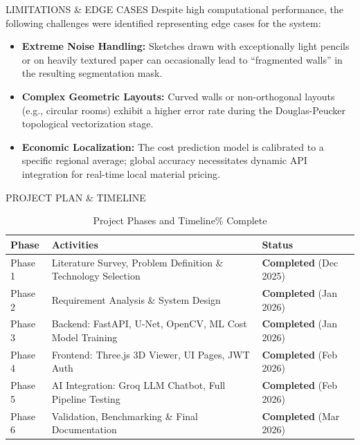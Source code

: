 \documentclass[aspectratio=169]{beamer}
\begin{document}
\begin{frame}{LIMITATIONS \& EDGE CASES}
Despite high computational performance, the following challenges were identified representing edge cases for the system:
\begin{itemize}
  \item \textbf{Extreme Noise Handling:} Sketches drawn with exceptionally light pencils or on heavily textured paper can occasionally lead to ``fragmented walls'' in the resulting segmentation mask.
  \item \textbf{Complex Geometric Layouts:} Curved walls or non-orthogonal layouts (e.g., circular rooms) exhibit a higher error rate during the Douglas-Peucker topological vectorization stage.
  \item \textbf{Economic Localization:} The cost prediction model is calibrated to a specific regional average; global accuracy necessitates dynamic API integration for real-time local material pricing.
\end{itemize}
\end{frame}
\begin{frame}{PROJECT PLAN \& TIMELINE}
\scriptsize
\begin{table}
\centering
\begin{tabular}{p{2cm} p{6.5cm} p{3.5cm}}
\toprule
\textbf{Phase} & \textbf{Activities} & \textbf{Status} \\
\midrule
Phase 1 & Literature Survey, Problem Definition \& Technology Selection & \textbf{Completed} (Dec 2025) \\
Phase 2 & Requirement Analysis \& System Design & \textbf{Completed} (Jan 2026) \\
Phase 3 & Backend: FastAPI, U-Net, OpenCV, ML Cost Model Training & \textbf{Completed} (Jan 2026) \\
Phase 4 & Frontend: Three.js 3D Viewer, UI Pages, JWT Auth & \textbf{Completed} (Feb 2026) \\
Phase 5 & AI Integration: Groq LLM Chatbot, Full Pipeline Testing & \textbf{Completed} (Feb 2026) \\
Phase 6 & Validation, Benchmarking \& Final Documentation & \textbf{Completed} (Mar 2026) \\
\bottomrule
\end{tabular}
\caption{Project Phases and Timeline\% Complete}
\end{table}
\end{frame}
\end{document}
